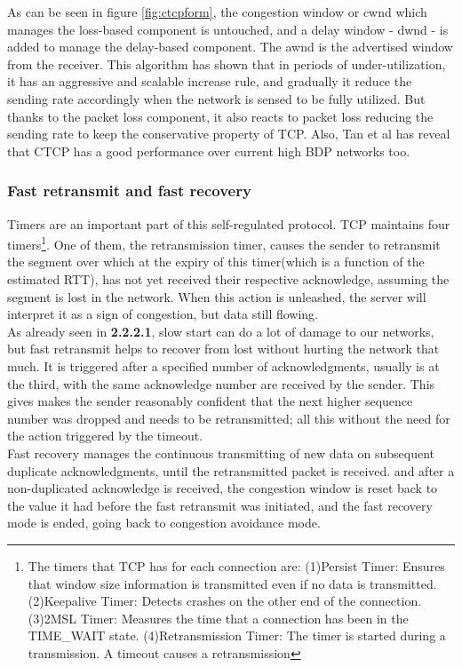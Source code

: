 As can be seen in figure \ref{fig:ctcpform}, the congestion window or cwnd which manages the loss-based component is untouched, and a delay window - dwnd - is added to manage the delay-based component.  The awnd is the advertised window from the receiver. This algorithm has shown that in periods of under-utilization, it has an aggressive and scalable increase rule, and gradually it reduce the sending rate accordingly when the network is sensed to be fully utilized. But thanks to the packet loss component, it also reacts to packet loss reducing the sending rate to keep the conservative property of TCP. Also, Tan et al\cite{Tan06compoundtcp} has reveal that CTCP has a good performance over current high BDP networks too.\\

\subsubsection{Fast retransmit and fast recovery} 
Timers are an important part of this self-regulated protocol. TCP maintains
four timers\footnote{The timers that TCP has for each connection are:
(1)Persist Timer: Ensures that window size information is transmitted even  if
no data is transmitted. (2)Keepalive Timer: Detects crashes on the other end
of the connection. (3)2MSL Timer: Measures the time that a connection has been
in the TIME\_WAIT state. (4)Retransmission Timer: The timer is started during
a transmission. A timeout causes a retransmission}. One of them, the
retransmission timer, causes the sender to retransmit the segment over which
at the expiry of this timer(which is a function of the estimated RTT), has not
yet received their respective acknowledge, assuming the segment is lost in the
network. When this action is unleashed, the server will interpret it as a sign
of congestion, but data still flowing.\\

As already seen in \textbf{2.2.2.1}, slow start can do a lot of damage to our
networks, but fast retransmit helps to recover from lost without hurting the
network that much. It is triggered after a specified number of
acknowledgments, usually is at the third, with the same acknowledge number are
received by the sender. This gives makes the sender reasonably confident that
the next higher sequence number was dropped and needs to be retransmitted; all
this without the need for the action triggered by the timeout.\\

Fast recovery manages the continuous transmitting of new data on subsequent
duplicate acknowledgments, until the retransmitted packet is received. and
after a non-duplicated acknowledge is received, the congestion window is reset
back to the value it had before the fast retransmit was initiated, and the
fast recovery mode is ended, going back to congestion avoidance mode.\\
